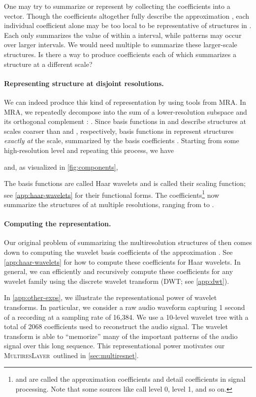 \documentclass{article}
\theoremstyle{plain}
\theoremstyle{definition}
\theoremstyle{remark}
\newcommand{\ourlayer}{\textsc{MultiresLayer}}
\newcommand{\prepar}{\vspace{-0.1in}}
\begin{document}
One may try to summarize or represent  by collecting the coefficients  into a vector.
Though the coefficients altogether fully describe the approximation , each individual coefficient alone may be too local to be representative of structures in .
Each  only summarizes the value of  within a  interval, while patterns may occur over larger intervals.
We would need multiple  to summarize these larger-scale structures.
Is there a way to produce coefficients each of which summarizes a structure at a different scale?

\prepar
\paragraph{Representing structure at disjoint resolutions.}
We can indeed produce this kind of representation by using tools from MRA.
In MRA, we repeatedly decompose  into the sum of a lower-resolution subspace  and its orthogonal complement : .
Since basis functions in  and  describe structures at scales coarser than  and , respectively, basis functions in  represent structures \emph{exactly at} the  scale, summarized by the basis coefficients .
Starting from some high-resolution level  and repeating this process, we have 

and, as visualized in \cref{fig:components},

The basis functions  are called Haar wavelets and  is called their scaling function; see \cref{app:haar-wavelets} for their functional forms. 
The coefficients\footnote{ and  are called the approximation coefficients and detail coefficients in signal processing. Note that some sources like \citet{Lee2019PyWaveletsPythonPackage} call  level 0,  level 1, and so on.}  now summarize the structures of  at multiple resolutions, ranging from  to .


\prepar
\paragraph{Computing the representation.}
Our original problem of summarizing the multiresolution structures of  then comes down to computing the wavelet basis coefficients  of the approximation .
See \cref{app:haar-wavelets} for how to compute these coefficients for Haar wavelets.
In general, we can efficiently and recursively compute these coefficients for any wavelet family using the discrete wavelet transform (DWT; see \cref{app:dwt}). 

In \cref{app:other-exps}, 
we illustrate the representational power of wavelet transforms.  In particular, we consider a raw audio waveform capturing 1 second of a recording at a sampling rate of 16,384.  We use a 10-level wavelet tree with a total of 2068 coefficients used to reconstruct the audio signal.  The wavelet transform is able to ``memorize'' many of the important patterns of the audio signal over this long sequence.  This representational power motivates our \ourlayer\ outlined in \cref{sec:multiresnet}.
\end{document}
